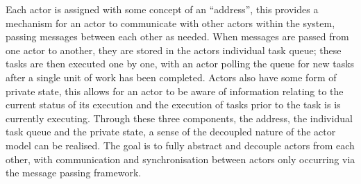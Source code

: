 \documentclass{article}
\begin{document}
	Each actor is assigned with some concept of an “address”, this provides a mechanism for an actor to communicate with other actors within the system, passing messages between each other as needed. When messages are passed from one actor to another, they are stored in the actors individual task queue; these tasks are then executed one by one, with an actor polling the queue for new tasks after a single unit of work has been completed. Actors also have some form of private state, this allows for an actor to be aware of information relating to the current status of its execution and the execution of tasks prior to the task is is currently executing. Through these three components, the address, the individual task queue and the private state, a sense of the decoupled nature of the actor model can be realised. The goal is to fully abstract and decouple actors from each other, with communication and synchronisation between actors only occurring via the message passing framework.
	
\end{document}
